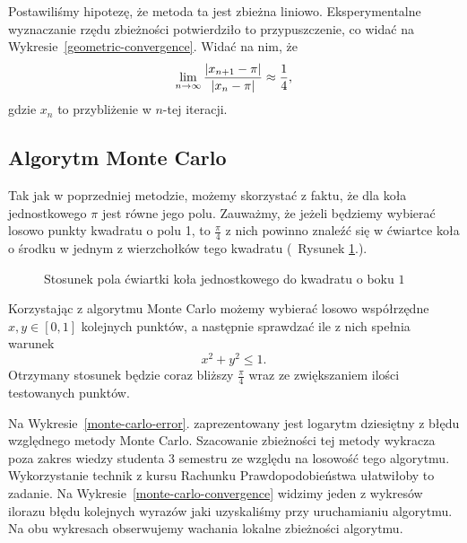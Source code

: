 Postawiliśmy hipotezę, że metoda ta jest zbieżna liniowo. Eksperymentalne wyznaczanie rzędu zbieżności potwierdziło to przypuszczenie, co widać na Wykresie~\ref{geometric-convergence}. Widać na nim, że
$$\lim_{n\to\infty}{|x_{n+1}-\pi|\over |x_n-\pi|}\approx\frac14,$$
gdzie $x_n$ to przybliżenie w $n$-tej iteracji.

\subsection{Algorytm Monte Carlo}

Tak jak w poprzedniej metodzie, możemy skorzystać z faktu, że dla koła jednostkowego $\pi$ jest równe jego polu. Zauważmy, że jeżeli będziemy wybierać losowo punkty kwadratu o polu 1, to $\frac\pi4$ z nich powinno znaleźć się w ćwiartce koła o środku w jednym z wierzchołków tego kwadratu (~Rysunek \ref{fig:monte-carlo}.).

\begin{figure}[!h]\centering
{}
\caption{Stosunek pola ćwiartki koła jednostkowego do kwadratu o boku $1$}
\label{fig:monte-carlo}
\end{figure}

Korzystając z algorytmu Monte Carlo możemy wybierać losowo współrzędne $x,y\in[0,1]$ kolejnych punktów, a następnie sprawdzać ile z nich spełnia warunek
$$x^2+y^2\leq1.$$
Otrzymany stosunek będzie coraz bliższy $\frac\pi4$ wraz ze zwiększaniem ilości testowanych punktów.

Na Wykresie~\ref{monte-carlo-error}. zaprezentowany jest logarytm dziesiętny z błędu względnego metody Monte Carlo. Szacowanie zbieżności tej metody wykracza poza zakres wiedzy studenta 3 semestru ze względu na losowość tego algorytmu. Wykorzystanie technik z kursu Rachunku Prawdopodobieństwa ułatwiłoby to zadanie. Na Wykresie~\ref{monte-carlo-convergence} widzimy jeden z wykresów ilorazu błędu kolejnych wyrazów jaki uzyskaliśmy przy uruchamianiu algorytmu. Na obu wykresach obserwujemy wachania lokalne zbieżności algorytmu.

